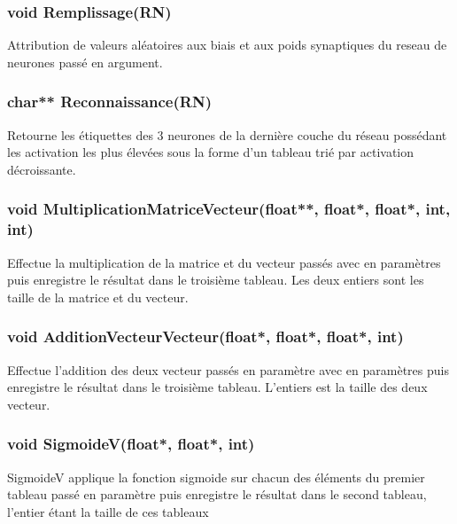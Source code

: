 \documentclass{article}
\begin{document}
		\subsubsection{\textcolor{myblue}{\textbf{void}} Remplissage(\textcolor{myblue}{\textbf{RN}})}
		Attribution de valeurs aléatoires aux biais et aux poids synaptiques du reseau de neurones passé en argument.
		
		\subsubsection{\textcolor{myblue}{\textbf{char**}} Reconnaissance(\textcolor{myblue}{\textbf{RN}})}
		Retourne les étiquettes des 3 neurones de la dernière couche du réseau possédant les activation les plus élevées sous la forme d'un tableau trié par activation décroissante.
		
		\subsubsection{\textcolor{myblue}{\textbf{void}} MultiplicationMatriceVecteur(\textcolor{myblue}{\textbf{float**}},  \textcolor{myblue}{\textbf{float*}},  \textcolor{myblue}{\textbf{float*}},  \textcolor{myblue}{\textbf{int}},  \textcolor{myblue}{\textbf{int}})}
		Effectue la multiplication de la matrice et du vecteur passés avec en paramètres puis enregistre le résultat dans le troisième tableau. Les deux entiers sont les taille de la matrice et du vecteur.
		
		\subsubsection{\textcolor{myblue}{\textbf{void}} AdditionVecteurVecteur(\textcolor{myblue}{\textbf{float*}},  \textcolor{myblue}{\textbf{float*}},  \textcolor{myblue}{\textbf{float*}},  \textcolor{myblue}{\textbf{int}})}
		Effectue l'addition des deux vecteur passés en paramètre avec en paramètres  puis enregistre le résultat dans le troisième tableau. L'entiers est la taille des deux vecteur.
		
		\subsubsection{\textcolor{myblue}{\textbf{void}} SigmoideV(\textcolor{myblue}{\textbf{float*}},  \textcolor{myblue}{\textbf{float*}},  \textcolor{myblue}{\textbf{int}})}
		SigmoideV applique la fonction sigmoide sur chacun des éléments du premier tableau passé en paramètre puis enregistre le résultat dans le second tableau, l'entier étant la taille de ces tableaux
		
\end{document}
